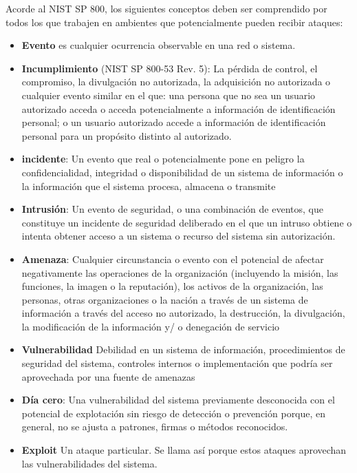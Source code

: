 Acorde al NIST SP 800, los siguientes conceptos deben ser comprendido por todos los que trabajen en ambientes que potencialmente pueden recibir ataques:
\begin{itemize}
    \item \textbf{Evento} es cualquier ocurrencia observable en una red o sistema. 

    \item \textbf{Incumplimiento} (NIST SP 800-53 Rev. 5):  La pérdida de control, el compromiso, la divulgación no autorizada, la adquisición no autorizada o cualquier evento similar en el que: una persona que no sea un usuario autorizado acceda o acceda potencialmente a información de identificación personal; o un usuario autorizado accede a información de identificación personal para un propósito distinto al autorizado. 
    
    \item \textbf{incidente}: Un evento que real o potencialmente pone en peligro la confidencialidad, integridad o disponibilidad de un sistema de información o la información que el sistema procesa, almacena o transmite
   
    \item \textbf{Intrusión}: Un evento de seguridad, o una combinación de eventos, que constituye un incidente de seguridad deliberado en el que un intruso obtiene o intenta obtener acceso a un sistema o recurso del sistema sin autorización.
   
    \item \textbf{Amenaza}: Cualquier circunstancia o evento con el potencial de afectar negativamente las operaciones de la organización (incluyendo la misión, las funciones, la imagen o la reputación), los activos de la organización, las personas, otras organizaciones o la nación a través de un sistema de información a través del acceso no autorizado, la destrucción, la divulgación, la modificación de la información y/ o denegación de servicio
    \item \textbf{Vulnerabilidad} Debilidad en un sistema de información, procedimientos de seguridad del sistema, controles internos o implementación que podría ser aprovechada por una fuente de amenazas
    \item \textbf{Día cero}: Una vulnerabilidad del sistema previamente desconocida con el potencial de explotación sin riesgo de detección o prevención porque, en general, no se ajusta a patrones, firmas o métodos reconocidos. 
    \item \textbf{Exploit} Un ataque particular. Se llama así porque estos ataques aprovechan las vulnerabilidades del sistema.
\end{itemize}

